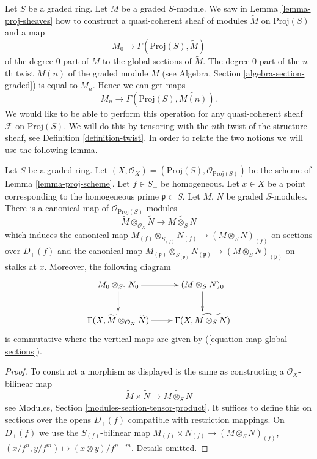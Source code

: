 \noindent
Let $S$ be a graded ring. Let $M$ be a graded $S$-module.
We saw in Lemma \ref{lemma-proj-sheaves} how to construct a quasi-coherent
sheaf of modules $\widetilde{M}$ on $\text{Proj}(S)$ and a map
\begin{equation}
\label{equation-map-global-sections}
M_0 \longrightarrow \Gamma(\text{Proj}(S), \widetilde{M})
\end{equation}
of the degree $0$ part of $M$ to the global sections of $\widetilde{M}$.
The degree $0$ part of the $n$th twist $M(n)$ of the graded module $M$ (see
Algebra, Section \ref{algebra-section-graded})
is equal to $M_n$. Hence we can get maps
\begin{equation}
\label{equation-map-global-sections-degree-n}
M_n \longrightarrow \Gamma(\text{Proj}(S), \widetilde{M(n)}).
\end{equation}
We would like to be able to perform this operation for any quasi-coherent
sheaf $\mathcal{F}$ on $\text{Proj}(S)$. We will do this by tensoring
with the $n$th twist of the structure sheaf, see
Definition \ref{definition-twist}. In order to relate the two notions
we will use the following lemma.

\begin{lemma}
\label{lemma-widetilde-tensor}
Let $S$ be a graded ring.
Let $(X, \mathcal{O}_X) = (\text{Proj}(S), \mathcal{O}_{\text{Proj}(S)})$
be the scheme of Lemma \ref{lemma-proj-scheme}.
Let $f \in S_{+}$ be homogeneous. Let $x \in X$ be a point
corresponding to the homogeneous prime $\mathfrak p \subset S$.
Let $M$, $N$ be graded $S$-modules.
There is a canonical map of $\mathcal{O}_{\text{Proj}(S)}$-modules
$$
\widetilde M \otimes_{\mathcal{O}_X} \widetilde N
\longrightarrow
\widetilde{M \otimes_S N}
$$
which induces the canonical map
$
M_{(f)} \otimes_{S_{(f)}} N_{(f)}
\to
(M \otimes_S N)_{(f)}
$
on sections over $D_{+}(f)$ and the canonical map
$
M_{(\mathfrak p)} \otimes_{S_{(\mathfrak p)}} N_{(\mathfrak p)}
\to
(M \otimes_S N)_{(\mathfrak p)}
$
on stalks at $x$. Moreover, the following diagram
$$
\xymatrix{
M_0 \otimes_{S_0} N_0 \ar[r] \ar[d] &
(M \otimes_S N)_0 \ar[d] \\
\Gamma(X, \widetilde M \otimes_{\mathcal{O}_X} \widetilde N) \ar[r] &
\Gamma(X, \widetilde{M \otimes_S N})
}
$$
is commutative where the vertical maps are given by
(\ref{equation-map-global-sections}).
\end{lemma}

\begin{proof}
To construct a morphism as displayed is the same as constructing
a $\mathcal{O}_X$-bilinear map
$$
\widetilde M \times \widetilde N
\longrightarrow
\widetilde{M \otimes_S N}
$$
see Modules, Section \ref{modules-section-tensor-product}.
It suffices to define this on sections over the opens $D_{+}(f)$
compatible with restriction mappings. On $D_{+}(f)$ we use the
$S_{(f)}$-bilinear map
$M_{(f)} \times N_{(f)} \to (M \otimes_S N)_{(f)}$,
$(x/f^n, y/f^m) \mapsto (x \otimes y)/f^{n + m}$. Details omitted.
\end{proof}

